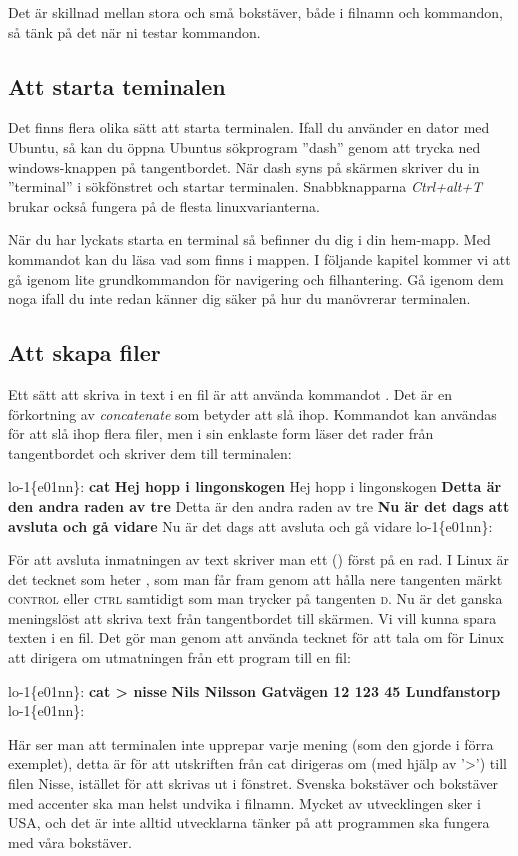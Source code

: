 \documentclass[a4paper,twocolumn]{book}
\begin{document}
Det är skillnad mellan stora och små bokstäver, både i filnamn och kommandon, så
tänk på det när ni testar kommandon.

\subsection{Att starta teminalen}
Det finns flera olika sätt att starta terminalen. Ifall du använder en dator med Ubuntu, så kan du öppna Ubuntus sökprogram ''dash''
genom att trycka ned windows-knappen på tangentbordet. När dash syns på skärmen skriver du in ''terminal'' i sökfönstret och startar terminalen.
Snabbknapparna \emph{Ctrl+alt+T} brukar också fungera på de flesta linuxvarianterna.  

När du har lyckats starta en terminal så befinner du dig i din hem-mapp. Med kommandot   kan du läsa vad som finns i mappen. 
I följande kapitel kommer vi att gå igenom lite grundkommandon för navigering och filhantering. Gå igenom dem noga ifall du inte redan 
känner dig säker på hur du manövrerar terminalen.

\subsection{Att skapa filer}

Ett sätt att skriva in text i en fil är att använda kommandot
. Det är en förkortning av \emph{concatenate} som betyder
att slå ihop. Kommandot kan användas för att slå ihop flera filer, men
i sin enklaste form läser det rader från tangentbordet och skriver dem
till terminalen:
\begin{example}
lo-1\{e01nn\}: \textbf{cat}
\textbf{Hej hopp i lingonskogen}
Hej hopp i lingonskogen
\textbf{Detta är den andra raden av tre}
Detta är den andra raden av tre
\textbf{Nu är det dags att avsluta och gå vidare}
Nu är det dags att avsluta och gå vidare
\textbf{}
lo-1\{e01nn\}: 
\end{example}
För att avsluta inmatningen av text skriver man ett
 () först på en rad. I
Linux är det tecknet som heter , som man får fram genom att
hålla nere tangenten märkt\label{control} \textsc{control} eller
\textsc{ctrl} samtidigt som man trycker på tangenten \textsc{d}.
Nu är det ganska meningslöst att skriva text från tangentbordet till
skärmen. Vi vill kunna spara texten i en fil. Det gör man genom att
använda tecknet \ttindex{>} för att tala om för Linux att dirigera om
utmatningen från ett program till en fil:
\begin{example}
lo-1\{e01nn\}: \textbf{cat > nisse}
\textbf{Nils Nilsson
Gatvägen 12
123 45 Lundfanstorp}
\textbf{}
lo-1\{e01nn\}: 
\end{example}
Här ser man att terminalen inte upprepar varje mening (som den gjorde i förra exemplet), detta är för att
utskriften från cat dirigeras om (med hjälp av '>') till filen Nisse, istället för att skrivas ut i fönstret.  
Svenska bokstäver och bokstäver med accenter
ska man helst undvika i filnamn. Mycket av utvecklingen sker i USA, och det är
inte alltid utvecklarna tänker på att programmen ska fungera med våra
bokstäver.
\end{document}
